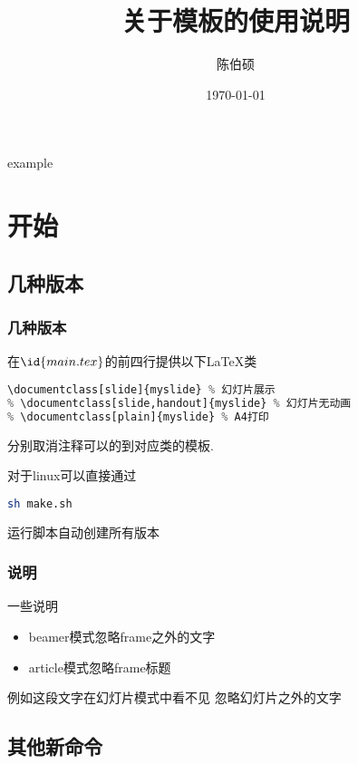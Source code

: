 \documentclass[slide]{myslide} %
\title{关于模板的使用说明}
\date{\today}
\author{陈伯硕}
\institute{github}
\begin{document}
\maketitle

\begin{frame}{example}
	\tableofcontents
\end{frame}

\section{开始}

\subsection{几种版本}



\begin{frame}[fragile]
  \frametitle{几种版本}
		在$\id{main.tex}$的前四行提供以下\LaTeX 类

\begin{lstlisting}[language=python]
% \documentclass[ebook]{myslide} % 移动设备
\documentclass[slide]{myslide} % 幻灯片展示
% \documentclass[slide,handout]{myslide} % 幻灯片无动画
% \documentclass[plain]{myslide} % A4打印
\end{lstlisting}
	分别取消注释可以的到对应类的模板.

	对于linux可以直接通过
\begin{lstlisting}[language=bash]
sh make.sh
\end{lstlisting}
	运行脚本自动创建所有版本

\end{frame}

\subsubsection{说明}

	\begin{frame}{一些说明}
		\begin{itemize}
			\item beamer模式忽略frame之外的文字
			\item article模式忽略frame标题
		\end{itemize}

	\end{frame}
	例如这段文字在幻灯片模式中看不见
	忽略幻灯片之外的文字

\subsection{其他新命令}
\end{document}

